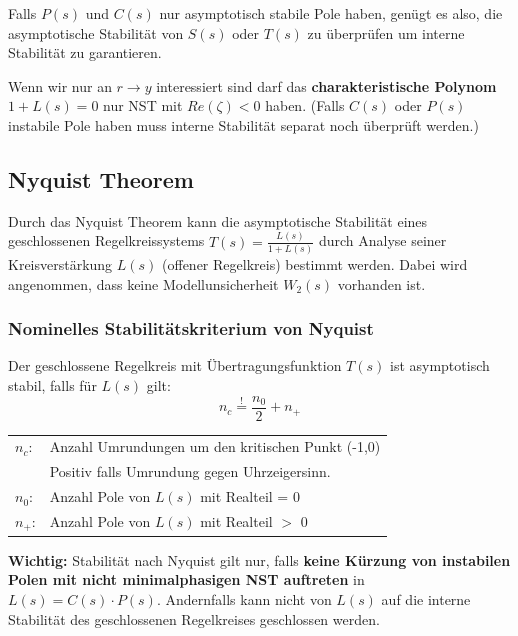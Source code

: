         Falls $P(s)$ und $C(s)$ nur asymptotisch stabile Pole haben, genügt es also, die asymptotische Stabilität von $S(s)$ oder $T(s)$ zu überprüfen um interne Stabilität zu garantieren.
        
        Wenn wir nur an $r\rightarrow y$ interessiert sind darf das \textbf{charakteristische Polynom} $1+L(s)=0$ nur NST mit $Re(\zeta)<0$ haben. (Falls $C(s)$ oder $P(s)$ instabile Pole haben muss interne Stabilität separat noch überprüft werden.)


    \subsection{Nyquist Theorem}
            Durch das Nyquist Theorem kann die asymptotische Stabilität eines geschlossenen Regelkreissystems $T(s)=\frac{L(s)}{1+L(s)}$ durch Analyse seiner Kreisverstärkung $L(s)$ (offener Regelkreis) bestimmt werden. Dabei wird angenommen, dass keine Modellunsicherheit $W_2(s)$ vorhanden ist.
        \subsubsection{Nominelles Stabilitätskriterium von Nyquist}
            Der geschlossene Regelkreis mit Übertragungsfunktion $T(s)$ ist asymptotisch stabil, falls für $L(s)$ gilt:
            \[n_c\overset{!}{=}\frac{n_0}{2}+n_+\]
            \begin{tabular}{l l}
                $n_c$:  & Anzahl Umrundungen um den kritischen Punkt (-1,0)  \\
                        & Positiv falls Umrundung gegen Uhrzeigersinn.\\
                $n_0$:  & Anzahl Pole von $L(s)$ mit Realteil = 0\\
                $n_+$:  & Anzahl Pole von $L(s)$ mit Realteil $>$ 0
            \end{tabular}
            \textbf{Wichtig:} Stabilität nach Nyquist gilt nur, falls \textbf{keine Kürzung von instabilen Polen mit nicht minimalphasigen NST auftreten} in $L(s)=C(s)\cdot P(s)$.
            Andernfalls kann nicht von $L(s)$ auf die interne Stabilität des geschlossenen Regelkreises geschlossen werden.
